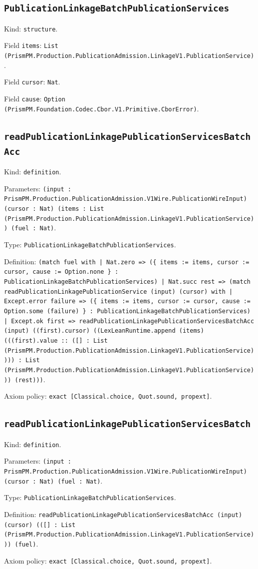\documentclass[11pt]{article}
\begin{document}
\subsection*{\texttt{PublicationLinkageBatchPublicationServices}}
\noindent Kind: \texttt{structure}.\par
\noindent Field \texttt{items}: \texttt{List (PrismPM.Production.PublicationAdmission.LinkageV1.PublicationService)}.\par
\noindent Field \texttt{cursor}: \texttt{Nat}.\par
\noindent Field \texttt{cause}: \texttt{Option (PrismPM.Foundation.Codec.Cbor.V1.Primitive.CborError)}.\par
\subsection*{\texttt{readPublicationLinkagePublicationServicesBatchAcc}}
\noindent Kind: \texttt{definition}.\par
\noindent Parameters: \texttt{(input : PrismPM.Production.PublicationAdmission.V1Wire.PublicationWireInput) (cursor : Nat) (items : List (PrismPM.Production.PublicationAdmission.LinkageV1.PublicationService)) (fuel : Nat)}.\par
\noindent Type: \texttt{PublicationLinkageBatchPublicationServices}.\par
\noindent Definition: \texttt{(match fuel with | Nat.zero => (\{ items := items, cursor := cursor, cause := Option.none \} : PublicationLinkageBatchPublicationServices) | Nat.succ rest => (match readPublicationLinkagePublicationService (input) (cursor) with | Except.error failure => (\{ items := items, cursor := cursor, cause := Option.some (failure) \} : PublicationLinkageBatchPublicationServices) | Except.ok first => readPublicationLinkagePublicationServicesBatchAcc (input) ((first).cursor) ((LexLeanRuntime.append (items) (((first).value :: ([] : List (PrismPM.Production.PublicationAdmission.LinkageV1.PublicationService)))) : List (PrismPM.Production.PublicationAdmission.LinkageV1.PublicationService))) (rest)))}.\par
\noindent Axiom policy: \texttt{exact [Classical.choice, Quot.sound, propext]}.\par
\subsection*{\texttt{readPublicationLinkagePublicationServicesBatch}}
\noindent Kind: \texttt{definition}.\par
\noindent Parameters: \texttt{(input : PrismPM.Production.PublicationAdmission.V1Wire.PublicationWireInput) (cursor : Nat) (fuel : Nat)}.\par
\noindent Type: \texttt{PublicationLinkageBatchPublicationServices}.\par
\noindent Definition: \texttt{readPublicationLinkagePublicationServicesBatchAcc (input) (cursor) (([] : List (PrismPM.Production.PublicationAdmission.LinkageV1.PublicationService))) (fuel)}.\par
\noindent Axiom policy: \texttt{exact [Classical.choice, Quot.sound, propext]}.\par
\end{document}
